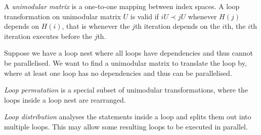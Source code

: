 A \emph{unimodular matrix} is a one-to-one mapping between index spaces.
A loop transformation on unimodular matrix $U$ is valid if $iU \prec jU$ whenever $H(j)$ depends on $H(i)$,
that is whenever the $j$th iteration depends on the $i$th, the $i$th iteration executes before the $j$th.

Suppose we have a loop nest where all loops have dependencies and thus cannot be parallelised.
We want to find a unimodular matrix to translate the loop by, where at least one loop has no dependencies
and thus can be parallelised.

\emph{Loop permutation} is a special subset of unimodular transformations, where the loops inside a loop nest are rearranged.

\emph{Loop distribution} analyses the statements inside a loop and splits them out into multiple loops.
This may allow some resulting loops to be executed in parallel.
